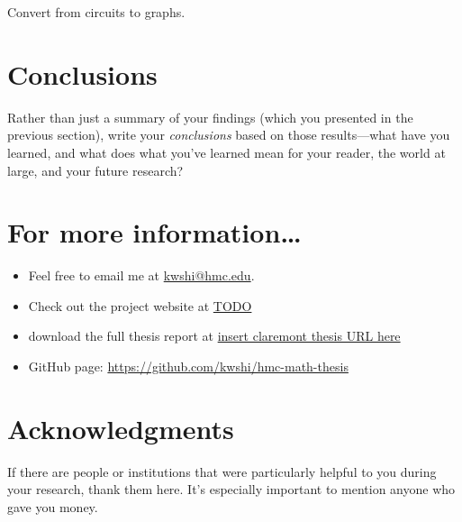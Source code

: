 \documentclass[thesis]{hmcposter}
\begin{document}
\begin{poster}
Convert from circuits to graphs.

\section{Conclusions}

Rather than just a summary of your findings (which you presented in
the previous section), write your \emph{conclusions} based on those
results---what have you learned, and what does what you've learned
mean for your reader, the world at large, and your future research?

\section{For more information…}

\begin{itemize}[nosep]
  \item Feel free to email me at \url{kwshi@hmc.edu}.
  \item Check out the project website at \url{TODO}
  \item download the full thesis report at \url{insert claremont thesis URL here}
  \item GitHub page: \url{https://github.com/kwshi/hmc-math-thesis}
\end{itemize}




\section{Acknowledgments}

If there are people or institutions that were particularly helpful
to you during your research, thank them here.  It's especially
important to mention anyone who gave you money.


\end{poster}
\end{document}
